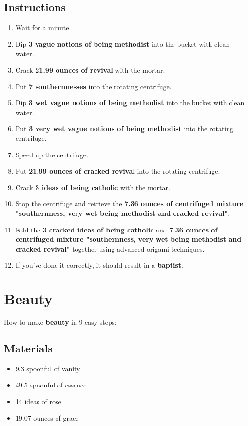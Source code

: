 \documentclass{article}
\begin{document}
\subsection{Instructions}\begin{enumerate}
\item 
Wait for a minute.
\item 
Dip \textbf{3 vague notions of being methodist} into the bucket with clean water.
\item 
Crack \textbf{21.99 ounces of revival} with the mortar.
\item 
Put \textbf{7 southernnesses} into the rotating centrifuge.
\item 
Dip \textbf{3 wet vague notions of being methodist} into the bucket with clean water.
\item 
Put \textbf{3 very wet vague notions of being methodist} into the rotating centrifuge.
\item 
Speed up the centrifuge.
\item 
Put \textbf{21.99 ounces of cracked revival} into the rotating centrifuge.
\item 
Crack \textbf{3 ideas of being catholic} with the mortar.
\item 
Stop the centrifuge and retrieve the \textbf{7.36 ounces of centrifuged mixture "southernness, very wet being methodist and cracked revival"}.
\item 
Fold the \textbf{3 cracked ideas of being catholic} and \textbf{7.36 ounces of centrifuged mixture "southernness, very wet being methodist and cracked revival"} together using advanced origami techniques.
\item 
If you've done it correctly, it should result in a \textbf{baptist}.
\end{enumerate}
\newpage
\section{Beauty}How to make \textbf{beauty} in 9 easy steps:

\subsection{Materials}\begin{itemize}
\item 
9.3 spoonful of vanity
\item 
49.5 spoonful of essence
\item 
14 ideas of rose
\item 
19.07 ounces of grace
\end{itemize}
\end{document}

